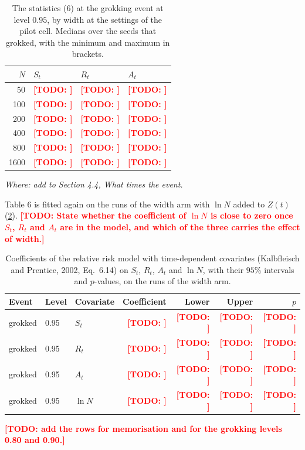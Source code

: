 \documentclass[a4paper,11pt]{article} %
\newcommand{\citepas}[2]{(#2)}
\newcommand{\gref}[2]{#2}
\newcommand{\TODO}[1]{\textcolor{red}{\textbf{[TODO: #1]}}}
\newcommand{\where}[1]{\par\smallskip\noindent\textit{\small Where: #1}\par\smallskip}
\begin{document}
\begin{table}[H]
  \centering
  \caption{The statistics \gref{eq:statistics}{(6)} at the grokking event at
    level $0.95$, by width at the settings of the pilot cell. Medians over the
    seeds that grokked, with the minimum and maximum in brackets.}
  \label{tab:widthkernel}
  \begin{tabular}{rlll}
    \toprule
    $N$ & $S_t$ & $R_t$ & $A_t$ \\
    \midrule
    50   & \TODO{} & \TODO{} & \TODO{} \\
    100  & \TODO{} & \TODO{} & \TODO{} \\
    200  & \TODO{} & \TODO{} & \TODO{} \\
    400  & \TODO{} & \TODO{} & \TODO{} \\
    800  & \TODO{} & \TODO{} & \TODO{} \\
    1600 & \TODO{} & \TODO{} & \TODO{} \\
    \bottomrule
  \end{tabular}
\end{table}

\where{add to Section 4.4, What times the event.}

Table 6 is fitted again on the runs of the width arm with $\ln N$ added to
$Z(t)$ (\cref{tab:widthcox}). \TODO{State whether the coefficient of $\ln N$ is
close to zero once $S_t$, $R_t$ and $A_t$ are in the model, and which of the
three carries the effect of width.}

\begin{table}[H]
  \centering
  \caption{Coefficients of the relative risk model with time-dependent
    covariates
    \citepas{kalbfleischStatisticalAnalysisFailure2002}{Kalbfleisch and
    Prentice, 2002, Eq.~6.14} on $S_t$, $R_t$, $A_t$ and $\ln N$, with their
    $95\%$ intervals and $p$-values, on the runs of the width arm.}
  \label{tab:widthcox}
  \begin{tabular}{lllrrrr}
    \toprule
    Event & Level & Covariate & Coefficient & Lower & Upper & $p$ \\
    \midrule
    grokked & 0.95 & $S_t$  & \TODO{} & \TODO{} & \TODO{} & \TODO{} \\
    grokked & 0.95 & $R_t$  & \TODO{} & \TODO{} & \TODO{} & \TODO{} \\
    grokked & 0.95 & $A_t$  & \TODO{} & \TODO{} & \TODO{} & \TODO{} \\
    grokked & 0.95 & $\ln N$ & \TODO{} & \TODO{} & \TODO{} & \TODO{} \\
    \bottomrule
  \end{tabular}

  \smallskip
  \TODO{add the rows for memorisation and for the grokking levels 0.80 and
    0.90.}
\end{table}
\end{document}
